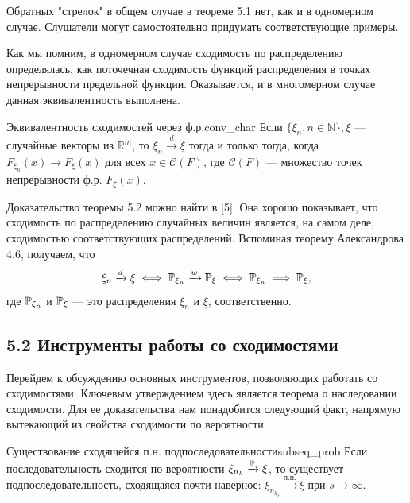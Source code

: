 \begin{remark}[Замечание 5.1]
    Обратных "стрелок" в общем случае в теореме 5.1 нет, как и в одномерном случае. Слушатели могут самостоятельно придумать соответствующие примеры.
\end{remark}

\vspace{1em}
Как мы помним, в одномерном случае сходимость по распределению определялась, как поточечная сходимость функций распределения в точках непрерывности предельной функции. Оказывается, и в многомерном случае данная эквивалентность выполнена. \hypertarget{cor:conv_char}{}

\begin{theorem}{Эквивалентность сходимостей через ф.р.}{conv_char}
    Если $\{\xi_n, n \in \mathbb{N}\}, \xi$ --- случайные векторы из $\mathbb{R}^m$, то $\xi_n \xrightarrow{d} \xi$ тогда и только тогда, когда $F_{\xi_n}(x) \to F_{\xi}(x)$ для всех $x \in \mathcal{C}(F)$, где $\mathcal{C}(F)$ --- множество точек непрерывности ф.р. $F_{\xi}(x)$.
\end{theorem}

\vspace{1em}
Доказательство теоремы 5.2 можно найти в [5]. Она хорошо показывает, что сходимость по распределению случайных величин является, на самом деле, сходимостью соответствующих распределений. Вспоминая теорему Александрова 4.6, получаем, что
$$ \xi_n \xrightarrow{d} \xi \iff \P_{\xi_n} \xrightarrow{w} \P_{\xi} \iff \P_{\xi_n} \implies \P_{\xi}, $$
где $\P_{\xi_n}$ и $\P_{\xi}$ --- это распределения $\xi_n$ и $\xi$, соответственно.

\vspace{2em}
\subsection*{5.2 Инструменты работы со сходимостями}

Перейдем к обсуждению основных инструментов, позволяющих работать со сходимостями. Ключевым утверждением здесь является теорема о наследовании сходимости. Для ее доказательства нам понадобится следующий факт, напрямую вытекающий из свойства сходимости по вероятности.

\vspace{1em}
\begin{lemma}{Существование сходящейся п.н. подпоследовательности}{subseq_prob}
    Если последовательность сходится по вероятности $\xi_{n_k} \xrightarrow{\P} \xi$, то существует подпоследовательность, сходящаяся почти наверное: $\xi_{n_{k_s}} \xrightarrow{\text{п.н.}} \xi$ при $s \to \infty$.
\end{lemma}

